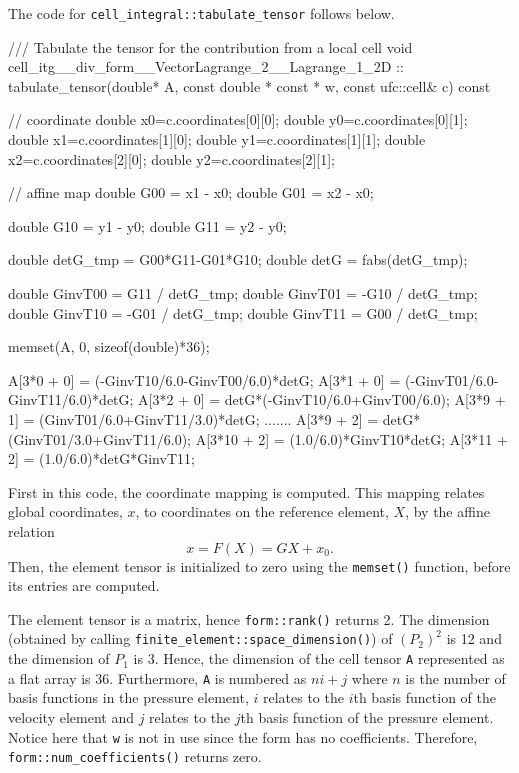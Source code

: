 The code for \texttt{cell\_integral::tabulate\_tensor} follows below.
\begin{code}
/// Tabulate the tensor for the contribution from a local cell
void cell_itg__div_form__VectorLagrange_2__Lagrange_1_2D ::
     tabulate_tensor(double* A, const double * const * w,
                     const ufc::cell& c) const
{
  // coordinate
  double x0=c.coordinates[0][0]; double y0=c.coordinates[0][1];
  double x1=c.coordinates[1][0]; double y1=c.coordinates[1][1];
  double x2=c.coordinates[2][0]; double y2=c.coordinates[2][1];
  
  // affine map
  double G00 = x1 - x0;
  double G01 = x2 - x0;
  
  double G10 = y1 - y0;
  double G11 = y2 - y0;
  
  double detG_tmp = G00*G11-G01*G10;
  double detG = fabs(detG_tmp);
  
  double GinvT00 =  G11 / detG_tmp;
  double GinvT01 = -G10 / detG_tmp;
  double GinvT10 = -G01 / detG_tmp;
  double GinvT11 =  G00 / detG_tmp;
  
  
  memset(A, 0, sizeof(double)*36);
  
  A[3*0 + 0] = (-GinvT10/6.0-GinvT00/6.0)*detG;
  A[3*1 + 0] = (-GinvT01/6.0-GinvT11/6.0)*detG;
  A[3*2 + 0] = detG*(-GinvT10/6.0+GinvT00/6.0);
  A[3*9 + 1] = (GinvT01/6.0+GinvT11/3.0)*detG;
  .......
  A[3*9 + 2] = detG*(GinvT01/3.0+GinvT11/6.0);
  A[3*10 + 2] = (1.0/6.0)*GinvT10*detG;
  A[3*11 + 2] = (1.0/6.0)*detG*GinvT11;
}
\end{code}

First in this code, the coordinate mapping is 
computed.
This mapping relates global coordinates, $x$, to coordinates
on the reference element, $X$, by the affine relation 
\[
x = F(X) = G X + x_0. 
\]
Then, the element tensor is initialized to zero using the \texttt{memset()}
function, before its entries are computed.

The element tensor is a matrix, hence \texttt{form::rank()} returns 2.
The dimension (obtained by calling \texttt{finite\_element::space\_dimension()})
of  $(P_2)^2$ is 12 and the dimension of $P_1$ is 3.    
Hence, the dimension of the cell tensor \texttt{A} represented as a    
flat array is 36.
Furthermore, \texttt{A} is numbered as $ni + j$ where
$n$ is the number of basis functions in the pressure element, 
$i$ relates to the $i$th basis function of the velocity element and
$j$ relates to the $j$th basis function of the pressure element. 
Notice here that \texttt{w} is not in use since the form has no
coefficients. Therefore, \texttt{form::num\_coefficients()} returns zero.

